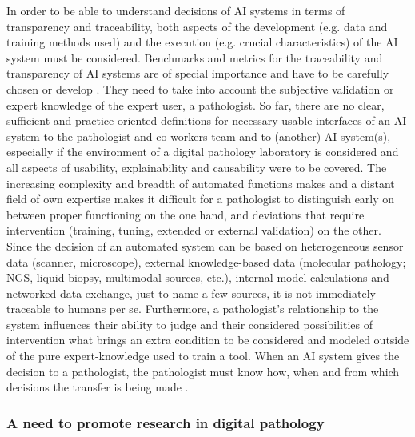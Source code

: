 In order to be able to understand decisions of AI systems in terms of transparency and traceability, both aspects of the development (e.g. data and training methods used) and the execution (e.g. crucial characteristics) of the AI system must be considered. Benchmarks and metrics for the traceability and transparency of AI systems are of special importance and have to be carefully chosen or develop \cite{ISO_IEC_TR_24028} \cite{ISO_IEC_TR_29119-11}. They need to take into account the subjective validation or expert knowledge of the expert user, a pathologist. So far, there are no clear, sufficient and practice-oriented definitions for necessary usable interfaces of an AI system to the pathologist and co-workers team and to (another) AI system(s), especially if the environment of a digital pathology laboratory is considered and all aspects of usability, explainability and causability were to be covered.
The increasing complexity and breadth of automated functions makes and a distant field of own expertise makes it difficult for a pathologist to distinguish early on between proper functioning on the one hand, and deviations that require intervention (training, tuning, extended or external validation) on the other. Since the decision of an automated system can be based on heterogeneous sensor data (scanner, microscope), external knowledge-based data (molecular pathology; NGS, liquid biopsy, multimodal sources, etc.), internal model calculations and networked data exchange, just to name a few sources, it is not immediately traceable to humans per se. Furthermore, a pathologist’s relationship to the system influences their ability to judge and their considered possibilities of intervention what brings an extra condition to be considered and modeled outside of the pure expert-knowledge used to train a tool.
When an AI system gives the decision to a pathologist, the pathologist must know how, when and from which decisions the transfer is being made \cite{ISO_IEC_TR_24028}.

\subsubsection{A need to promote research in digital pathology}

